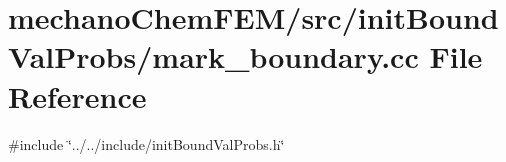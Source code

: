 \section{mechano\+Chem\+F\+E\+M/src/init\+Bound\+Val\+Probs/mark\+\_\+boundary.cc File Reference}
\label{mark__boundary_8cc}
{\ttfamily \#include \char`\"{}../../include/init\+Bound\+Val\+Probs.\+h\char`\"{}}\newline
